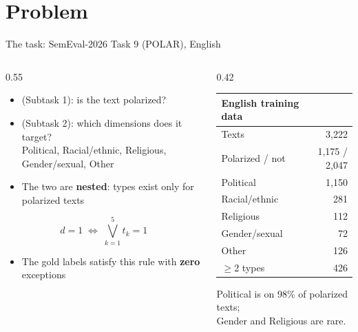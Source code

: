 \section{Problem}

\begin{frame}{The task: SemEval-2026 Task 9 (POLAR), English}
\begin{columns}[T]
\begin{column}{0.55\textwidth}
\begin{itemize}
\item \textbf{\DET{}} (Subtask 1): is the text polarized?
\item \textbf{\TYPE{}} (Subtask 2): which dimensions does it target?\\
{\small Political, Racial/ethnic, Religious, Gender/sexual, Other}
\item The two are \textbf{nested}: types exist only for polarized texts
\end{itemize}
\[
d = 1 \;\iff\; \bigvee_{k=1}^{5} t_k = 1
\]
\begin{itemize}
\item The gold labels satisfy this rule with \textbf{zero} exceptions
\end{itemize}
\end{column}
\begin{column}{0.42\textwidth}
\small
\begin{tabular}{@{}lr@{}}
\toprule
English training data & \\
\midrule
Texts & 3{,}222 \\
Polarized / not & 1{,}175 / 2{,}047 \\
Political & 1{,}150 \\
Racial/ethnic & 281 \\
Religious & 112 \\
Gender/sexual & 72 \\
Other & 126 \\
$\geq$2 types & 426 \\
\bottomrule
\end{tabular}

\vspace{4pt}
{\footnotesize Political is on 98\% of polarized texts;\\ Gender and Religious are rare.}
\end{column}
\end{columns}
\end{frame}

